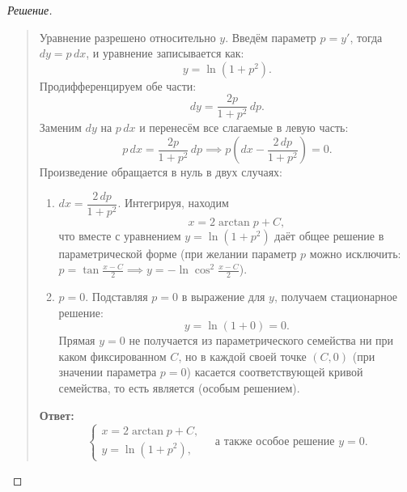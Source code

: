 \begin{proof}[Решение]~\\
    \begin{quote}
        Уравнение разрешено относительно $y$. Введём параметр $p = y'$, тогда
        $dy = p \, dx$, и уравнение записывается как:
        \[
            y = \ln\left(1 + p^2\right).
        \]
        Продифференцируем обе части:
        \[
            dy = \frac{2 p}{1 + p^2} \, dp.
        \]
        Заменим $dy$ на $p \, dx$ и перенесём все слагаемые в левую часть:
        \[
            p \, dx = \frac{2 p}{1 + p^2} \, dp \implies
            p \left(dx - \frac{2 \, dp}{1 + p^2}\right) = 0.
        \]
        Произведение обращается в нуль в двух случаях:
        \begin{enumerate}
            \item $dx = \dfrac{2 \, dp}{1 + p^2}$. Интегрируя, находим
            \[
                x = 2 \arctan p + C,
            \]
            что вместе с уравнением $y = \ln(1 + p^2)$ даёт общее решение в
            параметрической форме (при желании параметр $p$ можно исключить:
            $p = \tan\frac{x - C}{2} \implies y = -\ln\cos^2\frac{x - C}{2}$).
            \item $p = 0$. Подставляя $p = 0$ в выражение для $y$, получаем
            стационарное решение:
            \[
                y = \ln(1 + 0) = 0.
            \]
            Прямая $y = 0$ не получается из параметрического семейства ни при
            каком фиксированном $C$, но в каждой своей точке $(C, 0)$ (при
            значении параметра $p = 0$) касается соответствующей кривой
            семейства, то есть является  (особым решением).
        \end{enumerate}

        \textbf{Ответ:}
        \[
            \begin{cases}
                x = 2 \arctan p + C, \\
                y = \ln\left(1 + p^2\right),
            \end{cases}
            \quad \text{а также особое решение } y = 0.
        \]
    \end{quote}
\end{proof}